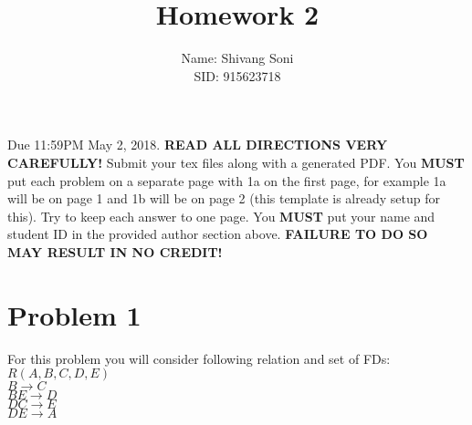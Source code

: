 \documentclass{article}
\begin{document}
\title{Homework 2}
\author{Name: Shivang Soni\\SID: 915623718}

\maketitle

Due 11:59PM May 2, 2018. {\bf READ ALL DIRECTIONS VERY CAREFULLY!} 
Submit your tex files along with a generated PDF.
You {\bf MUST} put each problem on a separate page with 1a on the first page, for example 1a will be on page 1 and 1b will be on page 2 (this template is already setup for this). Try to keep each answer to one page. 
You {\bf MUST} put your name and student ID in the provided author section above. {\bf FAILURE TO DO SO MAY RESULT IN NO CREDIT!} 


\section*{Problem 1}
For this problem you will consider following relation and set of FDs:\\
$R(A,B,C,D,E)$\\
$B\rightarrow C$\\
$BE\rightarrow D$\\
$DC\rightarrow E$\\
$DE\rightarrow A$\\
\end{document}
